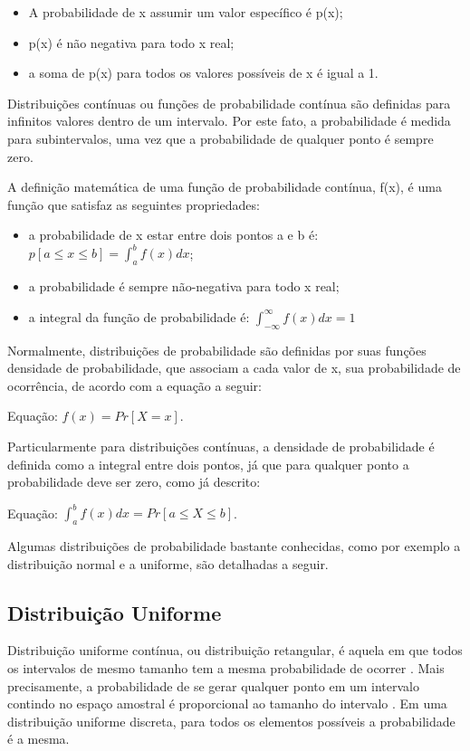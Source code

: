 \begin{itemize}
	\item A probabilidade de x assumir um valor específico é p(x);
	\item p(x) é não negativa para todo x real;
	\item a soma de p(x) para todos os valores possíveis de x é igual a 1.
\end{itemize}

Distribuições contínuas ou funções de probabilidade contínua são definidas para infinitos valores dentro de um intervalo. Por este fato, a probabilidade é medida para subintervalos, uma vez que a probabilidade de qualquer ponto é sempre zero\cite{distteoria}.

A definição matemática de uma função de probabilidade contínua, f(x), é uma função que satisfaz as seguintes propriedades:

\begin{itemize}
	\item a probabilidade de x estar entre dois pontos a e b é: \(p[a \leqslant x \leqslant b] = \int_{a}^{b}f(x)dx\);
	\item a probabilidade é sempre não-negativa para todo x real;
	\item a integral da função de probabilidade é: \(\int_{-\infty}^{\infty}f(x)dx = 1\)
\end{itemize}

Normalmente, distribuições de probabilidade são definidas por suas funções densidade de probabilidade, que associam a cada valor de x, sua probabilidade de ocorrência, de acordo com a equação a seguir: 

Equação: \(f(x) = Pr[X = x]\).

Particularmente para distribuições contínuas, a densidade de probabilidade é definida como a integral entre dois pontos, já que para qualquer ponto a probabilidade deve ser zero, como já descrito:

Equação: \(\int_{a}^{b}f(x)dx = Pr[a \leqslant X \leqslant b]\).

Algumas distribuições de probabilidade bastante conhecidas, como por exemplo a distribuição normal e a uniforme, são detalhadas a seguir.

\subsection{Distribuição Uniforme}

Distribuição uniforme contínua, ou distribuição retangular, é aquela em que todos os intervalos de mesmo tamanho tem a mesma probabilidade de ocorrer \cite{wikidistuniform1}. Mais precisamente, a probabilidade de se gerar qualquer ponto em um intervalo contindo no espaço amostral é proporcional ao tamanho do intervalo \cite{wikidistuniform2}. Em uma distribuição uniforme discreta, para todos os elementos possíveis a probabilidade é a mesma.

